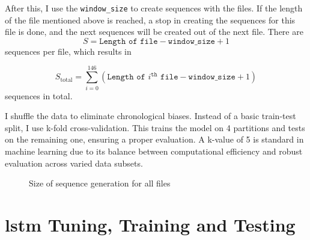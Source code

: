 After this, I use the \texttt{window\_size} to create sequences with the files.
If the length of the file mentioned above is reached, a stop in creating the sequences for this file is done, and the next sequences will be created out of the next file.
There are 
\[S = \texttt{Length of file} - \texttt{window\_size} + 1\] 
sequences per file, which results in 

\[
    S_{\text{total}} = \sum_{i=0}^{146} (\texttt{Length of } i^{\texttt{th}} \texttt{ file} - \texttt{window\_size} + 1)
\]
sequences in total.

I shuffle the data to eliminate chronological biases. 
Instead of a basic train-test split, I use k-fold cross-validation.
This trains the model on 4 partitions and tests on the remaining one, ensuring a proper evaluation.
A k-value of 5 is standard in machine learning due to its balance between computational efficiency and robust evaluation across varied data subsets.

\begin{figure}[h]
    \centering
    
    \caption{Size of sequence generation for all files}
    \label{fig:sequence_generation}
\end{figure}



\section{\ac{lstm} Tuning, Training and Testing}

